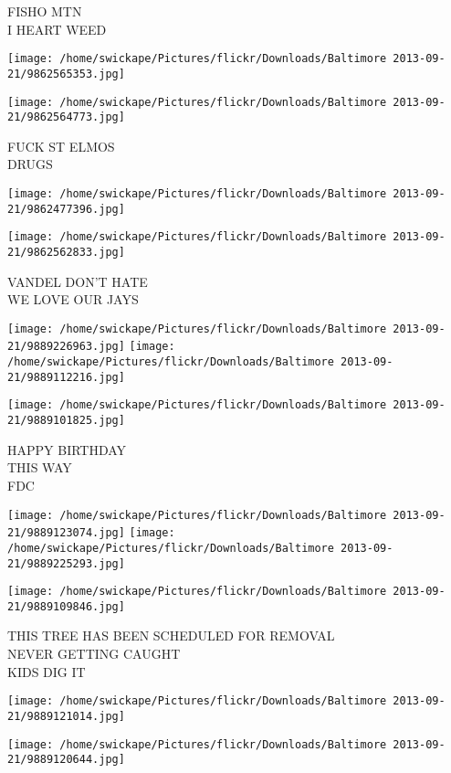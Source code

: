 \documentclass[10pt,letterpaper]{article}
\begin{document}
FISHO MTN\\
I HEART WEED
\pagebreak

\texttt{[image: /home/swickape/Pictures/flickr/Downloads/Baltimore 2013-09-21/9862565353.jpg]}

\vspace{0.25in}
\texttt{[image: /home/swickape/Pictures/flickr/Downloads/Baltimore 2013-09-21/9862564773.jpg]}

FUCK ST ELMOS\\
DRUGS
\pagebreak

\texttt{[image: /home/swickape/Pictures/flickr/Downloads/Baltimore 2013-09-21/9862477396.jpg]}

\vspace{0.25in}
\texttt{[image: /home/swickape/Pictures/flickr/Downloads/Baltimore 2013-09-21/9862562833.jpg]}

VANDEL DON'T HATE\\
WE LOVE OUR JAYS
\pagebreak

\texttt{[image: /home/swickape/Pictures/flickr/Downloads/Baltimore 2013-09-21/9889226963.jpg]}
\texttt{[image: /home/swickape/Pictures/flickr/Downloads/Baltimore 2013-09-21/9889112216.jpg]}

\vspace{0.25in}
\texttt{[image: /home/swickape/Pictures/flickr/Downloads/Baltimore 2013-09-21/9889101825.jpg]}

HAPPY BIRTHDAY\\
THIS WAY\\
FDC
\pagebreak

\texttt{[image: /home/swickape/Pictures/flickr/Downloads/Baltimore 2013-09-21/9889123074.jpg]}
\texttt{[image: /home/swickape/Pictures/flickr/Downloads/Baltimore 2013-09-21/9889225293.jpg]}

\texttt{[image: /home/swickape/Pictures/flickr/Downloads/Baltimore 2013-09-21/9889109846.jpg]}

THIS TREE HAS BEEN SCHEDULED FOR REMOVAL\\
NEVER GETTING CAUGHT\\
KIDS DIG IT
\pagebreak

\texttt{[image: /home/swickape/Pictures/flickr/Downloads/Baltimore 2013-09-21/9889121014.jpg]}

\vspace{0.25in}
\texttt{[image: /home/swickape/Pictures/flickr/Downloads/Baltimore 2013-09-21/9889120644.jpg]}
\end{document}
